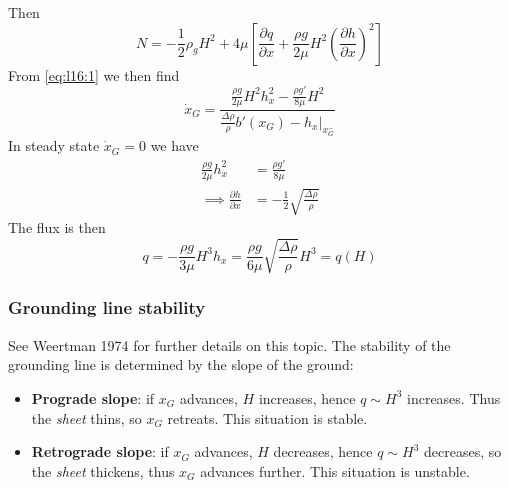 \documentclass{jknotes}
\begin{document}
Then
\begin{equation}
	N = -\frac{1}{2}\rho_g H^2 + 4\mu \left[ \frac{\partial q}{\partial x} +
	\frac{\rho g}{2\mu} H^2 \left(\frac{\partial h}{\partial
	x}\right)^2\right]
\end{equation}
From \eqref{eq:l16:1} we then find
\begin{equation}
	\dot{x}_G = \frac{\frac{\rho g}{2\mu} H^2 h_x^2 - \frac{\rho g'}{8\mu}
	H^2}{\frac{\Delta \rho}{\rho}b'(x_G) - \left.h_x\right|_{x_G^-}}
\end{equation}
In steady state $\dot{x}_G = 0$ we have
\begin{align}
	\frac{\rho g}{2\mu} h_x^2 &= \frac{\rho g'}{8\mu} \\
	\implies \frac{\partial h}{\partial x} &= -\frac{1}{2}\sqrt{\frac{\Delta
	\rho}{\rho}}
\end{align}
The flux is then
\begin{equation}
	q = -\frac{\rho g}{3\mu} H^3 h_x = \frac{\rho g}{6\mu} \sqrt{\frac{\Delta
	\rho}{\rho}} H^3 = q(H)
\end{equation}

\subsubsection{Grounding line stability}
See Weertman 1974 for further details on this topic. The stability of the
grounding line is determined by the slope of the ground:
\begin{itemize}
	\item \textbf{Prograde slope}: if $x_G$ advances, $H$ increases, hence $q
		\sim H^3$ increases. Thus the \emph{sheet} thins, so $x_G$ retreats.
		This situation is stable.
		\begin{center}
		\end{center}
	\item \textbf{Retrograde slope}: if $x_G$ advances, $H$ decreases, hence
		$q \sim H^3$ decreases, so the \emph{sheet} thickens, thus $x_G$
		advances further. This situation is unstable.
		\begin{center}
		\end{center}
\end{itemize}
\end{document}
